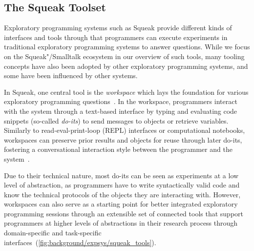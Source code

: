 \subsection*[The Squeak Toolset]{%
	The Squeak Toolset
	\hfill
}
\label{sec:background/expsys/tools}

Exploratory programming systems such as Squeak provide different kinds of interfaces and tools through that programmers can execute experiments in traditional exploratory programming systems to answer questions.
While we focus on the Squeak"/Smalltalk ecosystem in our overview of such tools, many tooling concepts have also been adopted by other exploratory programming systems, and some have been influenced by other systems.

In Squeak, one central tool is the \emph{workspace} which lays the foundation for various exploratory programming questions~\cites[chap.~6]{goldberg1984smalltalk}[sec.~1.4]{thiede2023squeak}.
In the workspace, programmers interact with the system through a text-based interface by typing and evaluating code snippets (so-called \emph{do-its}) to send messages to objects or retrieve variables.
Similarly to read-eval-print-loop (REPL) interfaces or computational notebooks, workspaces can preserve prior results and objects for reuse through later do-its, fostering a conversational interaction style between the programmer and the system~\cite{taeumel2022pattern}.

Due to their technical nature, most do-its can be seen as experiments at a low level of abstraction, as programmers have to write syntactically valid code and know the technical protocols of the objects they are interacting with.
However, workspaces can also serve as a starting point for better integrated exploratory programming sessions through an extensible set of connected tools that support programmers at higher levels of abstractions in their research process through domain-specific and task-specific interfaces~(\cref{fig:background/expsys/squeak_tools}).

